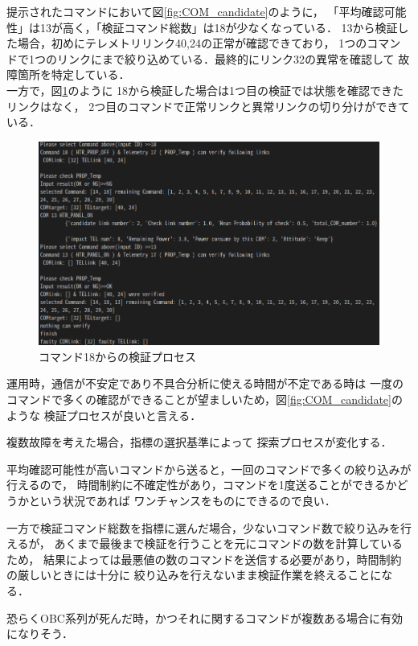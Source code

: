 \documentclass[11pt]{jsreport}
\begin{document}
提示されたコマンドにおいて図\ref{fig:COM_candidate}のように，
「平均確認可能性」は13が高く，「検証コマンド総数」は18が少なくなっている．
13から検証した場合，初めにテレメトリリンク40,24の正常が確認できており，
1つのコマンドで1つのリンクにまで絞り込めている．最終的にリンク32の異常を確認して
故障箇所を特定している．\\
一方で，図\ref{fig:COM_phase_18start}のように
18から検証した場合は1つ目の検証では状態を確認できたリンクはなく，
2つ目のコマンドで正常リンクと異常リンクの切り分けができている．
\begin{figure}[H]
  \centering
    \includegraphics[width=13.0cm]{figure/COM14_TEL17_COM_COM_18start.png}
    \caption{コマンド18からの検証プロセス}
    \label{fig:COM_phase_18start}
\end{figure}
運用時，通信が不安定であり不具合分析に使える時間が不定である時は
一度のコマンドで多くの確認ができることが望ましいため，図\ref{fig:COM_candidate}のような
検証プロセスが良いと言える．



複数故障を考えた場合，指標の選択基準によって
探索プロセスが変化する．


平均確認可能性が高いコマンドから送ると，一回のコマンドで多くの絞り込みが行えるので，
時間制約に不確定性があり，コマンドを1度送ることができるかどうかという状況であれば
ワンチャンスをものにできるので良い．

一方で検証コマンド総数を指標に選んだ場合，少ないコマンド数で絞り込みを行えるが，
あくまで最後まで検証を行うことを元にコマンドの数を計算しているため，
結果によっては最悪値の数のコマンドを送信する必要があり，時間制約の厳しいときには十分に
絞り込みを行えないまま検証作業を終えることになる．

恐らくOBC系列が死んだ時，かつそれに関するコマンドが複数ある場合に有効になりそう．
\end{document}
